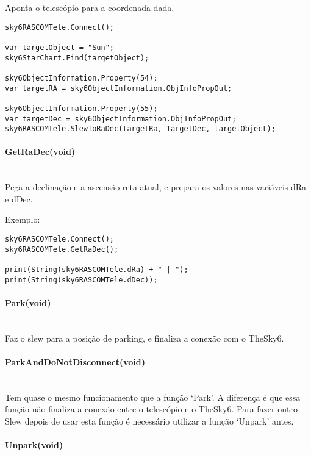 \documentclass{article}
\begin{document}
Aponta o telescópio para a coordenada dada.

\begin{lstlisting}
sky6RASCOMTele.Connect();

var targetObject = "Sun";
sky6StarChart.Find(targetObject);

sky6ObjectInformation.Property(54);
var targetRA = sky6ObjectInformation.ObjInfoPropOut;

sky6ObjectInformation.Property(55);
var targetDec = sky6ObjectInformation.ObjInfoPropOut;
sky6RASCOMTele.SlewToRaDec(targetRa, TargetDec, targetObject);
\end{lstlisting}

\paragraph{GetRaDec(void)}\mbox{}\\

Pega a declinação e a ascensão reta atual, e prepara os valores nas variáveis dRa e dDec.

Exemplo:

\begin{lstlisting}
sky6RASCOMTele.Connect();
sky6RASCOMTele.GetRaDec();

print(String(sky6RASCOMTele.dRa) + " | ");
print(String(sky6RASCOMTele.dDec));
\end{lstlisting}

\paragraph{Park(void)}\mbox{}\\


Faz o slew para a posição de parking, e finaliza a conexão com o TheSky6.

\paragraph{ParkAndDoNotDisconnect(void)}\mbox{}\\

Tem quase o mesmo funcionamento que a função `Park'. A diferença é que essa função não finaliza a conexão entre o telescópio e o TheSky6.
Para fazer outro Slew depois de usar esta função é necessário utilizar a função `Unpark' antes.

\paragraph{Unpark(void)}\mbox{}\\
\end{document}
